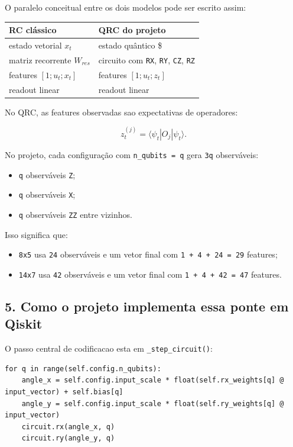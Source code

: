 \documentclass[12pt]{article}
\providecommand{\tightlist}{%
          \setlength{\itemsep}{0pt}\setlength{\parskip}{0pt}}
\begin{document}
O paralelo conceitual entre os dois modelos pode ser escrito assim:

\begin{longtable}[]{@{}ll@{}}
\toprule\noalign{}
RC clássico & QRC do projeto \\
\midrule\noalign{}
\endhead
\bottomrule\noalign{}
\endlastfoot
estado vetorial \(x_t\) & estado quântico \$ \\
matriz recorrente \(W_{res}\) & circuito com \texttt{RX}, \texttt{RY}, \texttt{CZ}, \texttt{RZ} \\
features \([1; u_t; x_t]\) & features \([1; u_t; z_t]\) \\
readout linear & readout linear \\
\end{longtable}

No QRC, as features observadas sao expectativas de operadores:

\[
z_t^{(j)} = \langle \psi_t | O_j | \psi_t \rangle.
\]

No projeto, cada configuração com \texttt{n\_qubits\ =\ q} gera \texttt{3q} observáveis:

\begin{itemize}
\tightlist
\item
  \texttt{q} observáveis \texttt{Z};
\item
  \texttt{q} observáveis \texttt{X};
\item
  \texttt{q} observáveis \texttt{ZZ} entre vizinhos.
\end{itemize}

Isso significa que:

\begin{itemize}
\tightlist
\item
  \texttt{8x5} usa \texttt{24} observáveis e um vetor final com \texttt{1\ +\ 4\ +\ 24\ =\ 29} features;
\item
  \texttt{14x7} usa \texttt{42} observáveis e um vetor final com \texttt{1\ +\ 4\ +\ 42\ =\ 47} features.
\end{itemize}

\subsection{5. Como o projeto implementa essa ponte em Qiskit}\label{5-como-o-projeto-implementa-essa-ponte-em-qiskit}

O passo central de codificacao esta em \texttt{\_step\_circuit()}:

\begin{verbatim}
for q in range(self.config.n_qubits):
    angle_x = self.config.input_scale * float(self.rx_weights[q] @ input_vector) + self.bias[q]
    angle_y = self.config.input_scale * float(self.ry_weights[q] @ input_vector)
    circuit.rx(angle_x, q)
    circuit.ry(angle_y, q)
\end{verbatim}
\end{document}
